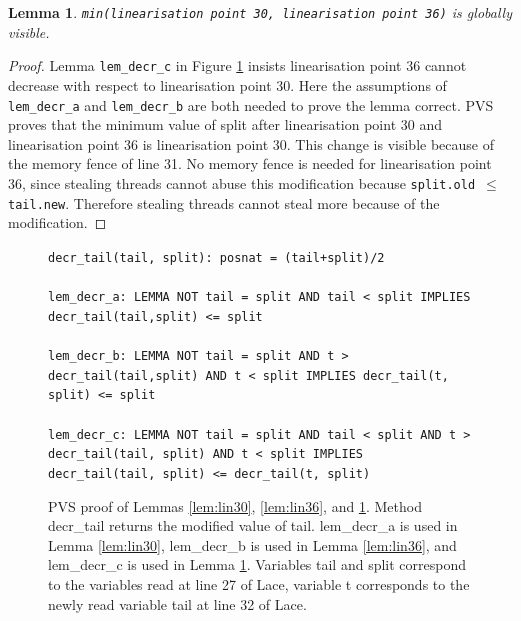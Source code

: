 \documentclass{sig-alternate-br}
\newtheorem{lemma}{Lemma}
\begin{document}
\begin{lemma}
	\texttt{min(linearisation point 30, linearisation point 36)} is globally visible.
	\label{lem:lin3036}
\end{lemma}
\begin{proof}
	Lemma \texttt{lem\_decr\_c} in Figure \ref{pvs:decrtail} insists linearisation point 36 cannot decrease with respect to linearisation point 30.
	Here the assumptions of \texttt{lem\_decr\_a} and \texttt{lem\_decr\_b} are both needed to prove the lemma correct.
	PVS proves that the minimum value of split after linearisation point 30 and linearisation point 36 is linearisation point 30.
	This change is visible because of the memory fence of line 31.
	No memory fence is needed for linearisation point 36, since stealing threads cannot abuse this modification because \texttt{split.old $\leq$ tail.new}.
	Therefore stealing threads cannot steal more because of the modification.	
\end{proof}
\begin{figure}[h]
	\texttt{decr\_tail(tail, split): posnat = (tail+split)/2}\\\\
	\texttt{lem\_decr\_a: LEMMA NOT tail = split AND tail < split IMPLIES decr\_tail(tail,split) <= split}\\\\
	\texttt{lem\_decr\_b: LEMMA NOT tail = split AND t > decr\_tail(tail,split) AND t < split IMPLIES decr\_tail(t, split) <= split}\\\\
	\texttt{lem\_decr\_c: LEMMA NOT tail = split AND tail < split AND t > decr\_tail(tail, split) AND t < split IMPLIES decr\_tail(tail, split) <= decr\_tail(t, split)}
	\caption{PVS proof of Lemmas \ref{lem:lin30}, \ref{lem:lin36}, and \ref{lem:lin3036}. Method decr\_tail returns the modified value of tail. lem\_decr\_a is used in Lemma \ref{lem:lin30}, lem\_decr\_b is used in Lemma \ref{lem:lin36}, and lem\_decr\_c is used in Lemma \ref{lem:lin3036}. Variables tail and split correspond to the variables read at line 27 of Lace, variable t corresponds to the newly read variable tail at line 32 of Lace.}
	\label{pvs:decrtail}
\end{figure}
\end{document}
